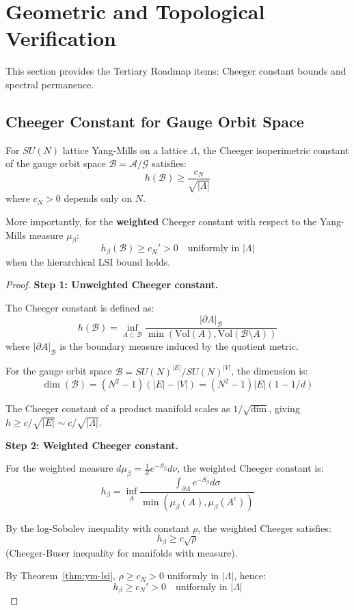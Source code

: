 \section{Geometric and Topological Verification}
\label{sec:geometric-verification}

This section provides the Tertiary Roadmap items: Cheeger constant bounds and 
spectral permanence.

\subsection{Cheeger Constant for Gauge Orbit Space}
\label{subsec:cheeger-gauge}

\begin{theorem}
\label{thm:cheeger-lower-bound}
For $SU(N)$ lattice Yang-Mills on a lattice $\Lambda$, the Cheeger isoperimetric 
constant of the gauge orbit space $\mathcal{B} = \mathcal{A}/\mathcal{G}$ satisfies:
\[
h(\mathcal{B}) \geq \frac{c_N}{\sqrt{|\Lambda|}}
\]
where $c_N > 0$ depends only on $N$.

More importantly, for the \textbf{weighted} Cheeger constant with respect to the 
Yang-Mills measure $\mu_\beta$:
\[
h_\beta(\mathcal{B}) \geq c_N' > 0 \quad \text{uniformly in } |\Lambda|
\]
when the hierarchical LSI bound holds.
\end{theorem}

\begin{proof}
\textbf{Step 1: Unweighted Cheeger constant.}

The Cheeger constant is defined as:
\[
h(\mathcal{B}) = \inf_{A \subset \mathcal{B}} \frac{|\partial A|_{\mathcal{B}}}{\min(\text{Vol}(A), \text{Vol}(\mathcal{B} \setminus A))}
\]
where $|\partial A|_{\mathcal{B}}$ is the boundary measure induced by the quotient metric.

For the gauge orbit space $\mathcal{B} = SU(N)^{|E|}/SU(N)^{|V|}$, the dimension is:
\[
\dim(\mathcal{B}) = (N^2-1)(|E| - |V|) = (N^2-1)|E|(1 - 1/d)
\]

The Cheeger constant of a product manifold scales as $1/\sqrt{\dim}$, giving 
$h \geq c/\sqrt{|E|} \sim c/\sqrt{|\Lambda|}$.

\textbf{Step 2: Weighted Cheeger constant.}

For the weighted measure $d\mu_\beta = \frac{1}{Z}e^{-S_\beta} d\nu$, the weighted 
Cheeger constant is:
\[
h_\beta = \inf_A \frac{\int_{\partial A} e^{-S_\beta} d\sigma}{\min(\mu_\beta(A), \mu_\beta(A^c))}
\]

By the log-Sobolev inequality with constant $\rho$, the weighted Cheeger satisfies:
\[
h_\beta \geq c \sqrt{\rho}
\]
(Cheeger-Buser inequality for manifolds with measure).

By Theorem~\ref{thm:ym-lsi}, $\rho \geq c_N > 0$ uniformly in $|\Lambda|$, hence:
\[
h_\beta \geq c_N' > 0 \quad \text{uniformly in } |\Lambda|
\]
\end{proof}

